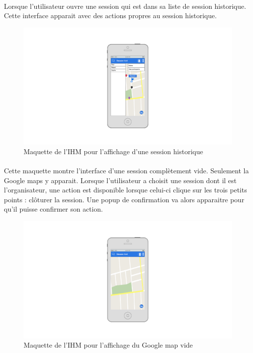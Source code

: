 \documentclass[titlepage, 12pt]{report}
\begin{document}
\clearpage

\paragraph{}Lorsque l'utilisateur ouvre une session qui est dans sa liste de session historique. Cette interface apparait avec des actions propres au session historique.

\begin{figure}[!h]
	\caption{Maquette de l'IHM pour l'affichage d'une session historique}
	\label{history_session}
	\centering
	\includegraphics[scale=0.3]{images/mockups/history_session.png}
\end{figure}

\clearpage

\paragraph{}Cette maquette montre l'interface d'une session complètement vide. Seulement la Google maps y apparait. Lorsque l'utilisateur a choisit une session dont il est l'organisateur, une action est disponible lorsque celui-ci clique sur les trois petits points : clôturer la session. Une popup de confirmation va alors apparaitre pour qu'il puisse confirmer son action.

\begin{figure}[!h]
	\caption{Maquette de l'IHM pour l'affichage du Google map vide}
	\label{google_map_view}
	\centering
	\includegraphics[scale=0.3]{images/mockups/google_map_view.png}
\end{figure}
\end{document}
